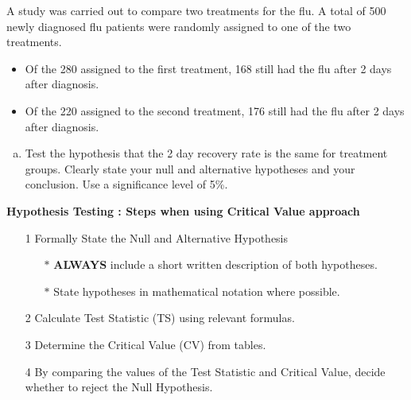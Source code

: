 \documentclass[a4paper,12pt]{article}
\begin{document}
\large 
\noindent 
A study was carried out to compare two treatments for the flu. A total of 500
newly diagnosed flu patients were randomly assigned to one of the two treatments.
\begin{itemize}
\item Of the 280 assigned to the first treatment, 168 still had the flu after 2 days after
diagnosis. \item Of the 220 assigned to the second treatment, 176 still had the flu after 2
days after diagnosis. 
\end{itemize} 


\begin{enumerate}[(a)]
\item Test the hypothesis that the 2 day recovery rate is the same for treatment groups. Clearly state your null and alternative hypotheses and your conclusion. Use a significance level of 5\%.
\end{enumerate}

\bigskip

\begin{framed}
\noindent \textbf{Hypothesis Testing : Steps when using Critical Value approach}

\begin{itemize}
\item[1] Formally State the Null and Alternative Hypothesis \smallskip
{
\begin{itemize}
\item[$\ast$] \textbf{ALWAYS} include a short written description of both hypotheses.
\item[$\ast$] State hypotheses in mathematical notation where possible.

\end{itemize}
}
\item[2] Calculate Test Statistic (TS) using relevant formulas.\smallskip
\item[3] Determine the Critical Value (CV) from tables. \smallskip
\item[4] By comparing the values of the Test Statistic and Critical Value, decide whether to reject the Null Hypothesis.
\end{itemize}
\end{framed}
\end{document}
